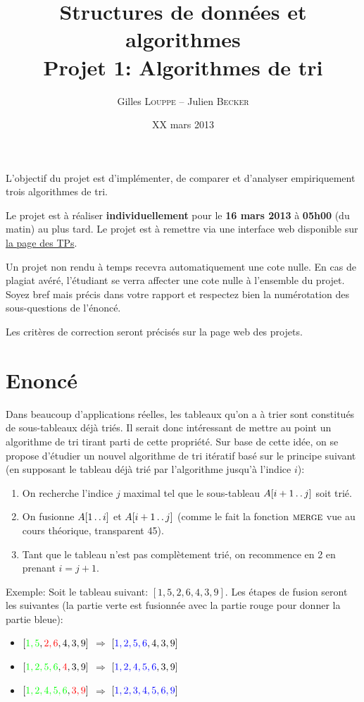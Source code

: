 \documentclass[a4paper,10pt]{article}
\title{
    \textbf{Structures de données et algorithmes}\\
    Projet 1: Algorithmes de tri
}
\author{Gilles \textsc{Louppe} -- Julien \textsc{Becker}}
\date{XX mars 2013}
\begin{document}
\maketitle

L'objectif du projet est d'implémenter, de comparer et d'analyser empiriquement
trois algorithmes de tri.

Le projet est à réaliser {\bf individuellement} pour le {\bf 16 mars 2013} à
{\bf 05h00} (du matin) au plus tard. Le projet est à remettre via une interface
web disponible sur \href{http://www.montefiore.ulg.ac.be/~glouppe/2012-2013/students.info0902.php}{la page des TPs}.

Un projet non rendu à temps recevra automatiquement une cote nulle. En
cas de plagiat avéré, l'étudiant se verra affecter une cote nulle à
l'ensemble du projet. Soyez bref mais précis dans votre rapport et
respectez bien la numérotation des sous-questions de l'énoncé.

Les critères de correction seront précisés sur la page web des
projets.

\section{Enoncé}

Dans beaucoup d'applications réelles, les tableaux qu'on a à trier
sont constitués de sous-tableaux déjà triés. Il serait donc
intéressant de mettre au point un algorithme de tri tirant parti de
cette propriété. Sur base de cette idée, on se propose d'étudier un
nouvel algorithme de tri itératif basé sur le principe suivant (en
supposant le tableau déjà trié par l'algorithme jusqu'à l'indice $i$):
\begin{enumerate}
\item On recherche l'indice $j$ maximal tel que le sous-tableau $A[i+1\mathinner{\ldotp\ldotp} j]$ soit trié.
\item On fusionne $A[1\mathinner{\ldotp\ldotp} i]$ et $A[i+1 \mathinner{\ldotp\ldotp} j]$ (comme le
  fait la fonction $\textnormal{\scshape merge}$ vue au cours théorique, transparent
  45).
\item Tant que le tableau n'est pas complètement trié, on recommence
  en 2 en prenant $i=j+1$.
\end{enumerate}

\bigskip

Exemple: Soit le tableau suivant: $[1,5,2,6,4,3,9]$. Les étapes de
fusion seront les suivantes (la partie verte est fusionnée avec la
partie rouge pour donner la partie bleue):
\begin{itemize}
\item $[{\color{green} 1,5},{\color{red} 2,6},4,3,9]$ $\Rightarrow$ $[{\color{blue} 1,2,5,6},4,3,9]$
\item $[{\color{green} 1,2,5,6},{\color{red}4},3,9]$ $\Rightarrow$ $[{\color{blue} 1,2,4,5,6},3,9]$
\item $[{\color{green} 1,2,4,5,6},{\color{red} 3,9}]$ $\Rightarrow$ $[{\color{blue} 1,2,3,4,5,6,9}]$
\end{itemize}
\end{document}
